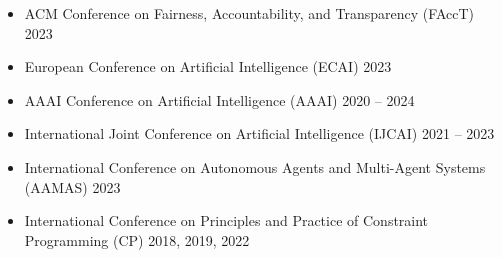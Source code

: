 
\begin{itemize}
  \item ACM Conference on Fairness, Accountability, and Transparency (FAccT) \hfill {2023}
  \item European Conference on Artificial Intelligence (ECAI) \hfill {2023}
\end{itemize}

\begin{itemize}
  \item AAAI Conference on Artificial Intelligence (AAAI) \hfill {2020 -- 2024}

  \item International Joint Conference on Artificial Intelligence (IJCAI) \hfill {2021 -- 2023}

  \item International Conference on Autonomous Agents and Multi-Agent Systems (AAMAS) \hfill {2023}

  \item International Conference on Principles and Practice of Constraint Programming (CP) \hfill{2018, 2019, 2022} 

\end{itemize}


